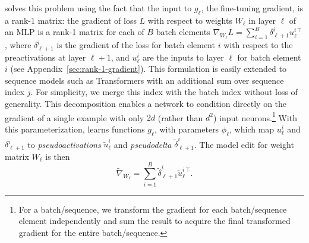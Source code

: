 \documentclass{article}
\begin{document}
{\name} solves this problem using the fact that the input to $g_\ell$, the fine-tuning gradient, is a rank-1 matrix: the gradient of loss $L$ with respect to weights $W_{\ell}$ in layer $\ell$ of an MLP is a rank-1 matrix for each of $B$ batch elements $\nabla_{W_\ell}L = \sum_{i=1}^B\delta_{\ell + 1}^i{u_\ell^{i\,\top}}$, where $\delta_{\ell+1}^i$ is the gradient of the loss for batch element $i$ with respect to the preactivations at layer $\ell+1$, and $u_\ell^i$ are the inputs to layer $\ell$ for batch element $i$ (see Appendix~\ref{sec:rank-1-gradient}). This formulation is easily extended to sequence models such as Transformers \citep{vaswani2017attention,radford2019language} with an additional sum over sequence index $j$. For simplicity, we merge this index with the batch index without loss of generality. This decomposition enables a network to condition directly on the gradient of a single example with only $2d$ (rather than $d^2$) input neurons.\footnote{For a batch/sequence, we transform the gradient for each batch/sequence element independently and sum the result to acquire the final transformed gradient for the entire batch/sequence.} With this parameterization, {\name} learns functions $g_\ell$, with parameters $\phi_\ell$, which map $u_\ell^i$ and $\delta_{\ell+1}^i$ to \textit{pseudoactivations} $\tilde u_\ell^i$ and \textit{pseudodelta} $\tilde\delta_{\ell+1}^i$. The model edit for weight matrix $W_\ell$ is then 
\vspace{-1mm}
\begin{equation}
    \label{eq:pseudogradient}
    \textstyle \tilde{\nabla}_{W_\ell} = \sum_{i=1}^B\tilde\delta_{\ell + 1}^{i}{\tilde u_\ell^{i\,\top}}.
\end{equation}
\vspace{-5.5mm}
\end{document}
